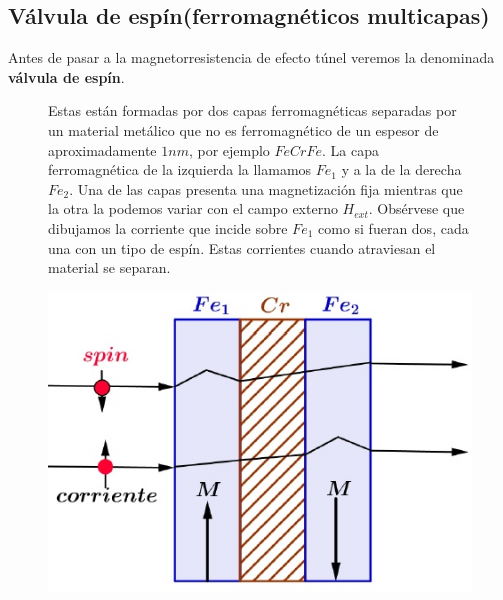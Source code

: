 \subsection{Válvula de espín(ferromagnéticos multicapas)}
Antes de pasar a la magnetorresistencia de efecto túnel veremos la denominada \textbf{válvula de espín}.




\begin{figure}[H]
  \begin{minipage}[b]{0.47\textwidth}
Estas están formadas por dos capas ferromagnéticas separadas por un material metálico que no es ferromagnético de un espesor de aproximadamente $1nm$, por ejemplo $FeCrFe$. La capa ferromagnética de la izquierda la llamamos $Fe_{1}$ y a la de la derecha $Fe_{2}$. Una de las capas presenta una magnetización fija mientras que la otra la podemos variar con el campo externo $H_{ext}$. Obsérvese que dibujamos la corriente que incide sobre $Fe_{1}$ como si fueran dos, cada una con un tipo de espín. Estas
corrientes cuando atraviesan el material se separan.
  \vspace{0cm}
  \end{minipage}
  \hfill
  \begin{minipage}[b]{0.47\textwidth}
     \includegraphics[width=1.0\textwidth]{./Figures/fig336}
	\label{fig:336}
	  \vspace{1.5cm}
  \end{minipage}
\end{figure}


